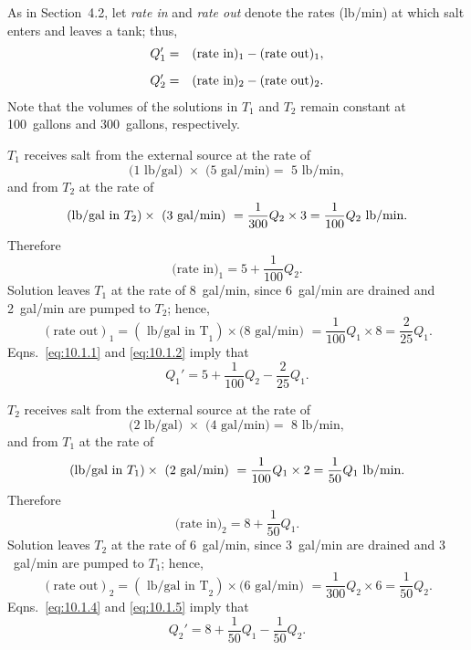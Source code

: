 \begin{examplesolution}
\solution As in Section~4.2, let {\relax\it rate in\/} and {\relax\it rate out\/} denote
the rates (lb/min) at which salt enters and leaves a tank; thus,
\begin{eqnarray*}
  Q_{1}' & = & (\mbox{rate in})_{1}-(\mbox{rate out})_{1}, \\[2\jot]
  Q_{2}' & = & (\mbox{rate in})_{2}-(\mbox{rate out})_{2}.
\end{eqnarray*}
Note that the volumes of the solutions in $T_{1}$ and $T_{2}$ remain constant at 100~gallons and
300~gallons, respectively.

$T_{1}$ receives salt from the external source at the rate of
\[
  \mbox{(1 lb/gal) }\times\mbox{ (5~gal/min)}=\mbox{ 5 lb/min},
\]
and from $T_{2}$ at the rate of
\[
  \mbox{(lb/gal in }T_{2})\times\mbox{ (3~gal/min) }=\frac{1}{300}Q_{2}\times3\\[2\jot]=\frac{1}{100}Q_{2}\mbox{ lb/min}.
\]
Therefore
\begin{equation}
  \label{eq:10.1.1}\mbox{(rate in)}_{1}=5+\frac{1}{100}Q_{2}.
\end{equation}
Solution leaves $T_{1}$ at the rate of 8~gal/min, since 6~gal/min are drained and 2~gal/min are
pumped to $T_{2}$; hence,
\begin{equation}
  \label{eq:10.1.2}(\mbox{rate out})_{1}=(\mbox{ lb/gal in T}_{1})\times\mbox{(8~gal/min) }=\frac{1}{100}Q_{1}\times8=\frac{2}{25}Q_{1}.
\end{equation}
Eqns.~\eqref{eq:10.1.1} and \eqref{eq:10.1.2} imply that
\begin{equation}
  \label{eq:10.1.3}Q_{1}'=5+\frac{1}{100}Q_{2}-\frac{2}{25}Q_{1}.
\end{equation}

$T_{2}$ receives salt from the external source at the rate of
\[
  \mbox{(2 lb/gal) }\times\mbox{ (4~gal/min)}=\mbox{ 8 lb/min},
\]
and from $T_{1}$ at the rate of
\[
  \mbox{(lb/gal in }T_{1})\times\mbox{ (2~gal/min) }=\frac{1}{100}Q_{1}\times2\\[2\jot]=\frac{1}{50}Q_{1}\mbox{ lb/min}.
\]
Therefore
\begin{equation}
  \label{eq:10.1.4}\mbox{(rate in)}_{2}=8+\frac{1}{50}Q_{1}.
\end{equation}
Solution leaves $T_{2}$ at the rate of $6$~gal/min, since $3$~gal/min are drained and $3$~gal/min
are pumped to $T_{1}$; hence,
\begin{equation}
  \label{eq:10.1.5}(\mbox{rate out})_{2}=(\mbox{ lb/gal in T}_{2})\times\mbox{(6~gal/min) }=\frac{1}{300}Q_{2}\times6=\frac{1}{50}Q_{2}.
\end{equation}
Eqns.~\eqref{eq:10.1.4} and \eqref{eq:10.1.5} imply that
\begin{equation}
  \label{eq:10.1.6}Q_{2}'=8+\frac{1}{50}Q_{1}-\frac{1}{50}Q_{2}.
\end{equation}


\end{examplesolution}
